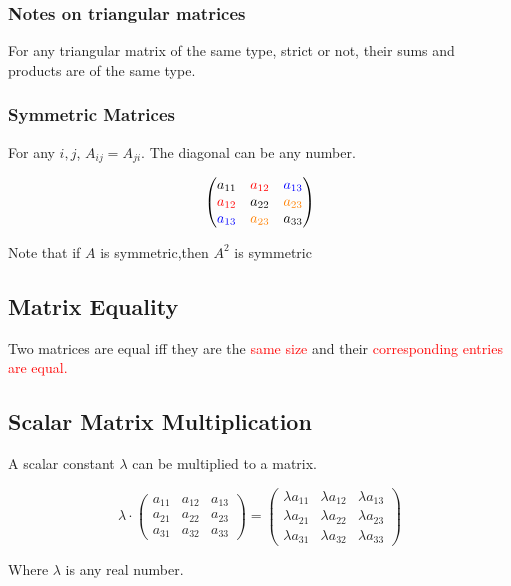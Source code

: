 \documentclass{article}
\begin{document}
\subsubsection{Notes on triangular matrices}
For any triangular matrix of the same type, strict or not, their sums and products are of the same type.

\subsubsection{Symmetric Matrices}
For any $i, j$, $A_{ij} = A_{ji}$. The diagonal can be any number.

\[
\begin{pmatrix}
a_{11} & \textcolor{red}{a_{12}} & \textcolor{blue}{a_{13}} \\
\textcolor{red}{a_{12}} & a_{22} & \textcolor{orange}{a_{23}} \\
\textcolor{blue}{a_{13}} & \textcolor{orange}{a_{23}} & a_{33} 
\end{pmatrix}
\]

Note that if $A$ is symmetric,then $A^2$ is symmetric
\subsection{Matrix Equality}
Two matrices are equal iff they are the \textcolor{red}{same size} and their \textcolor{red}{corresponding entries are equal.}

\subsection{Scalar Matrix Multiplication}
A scalar constant $\lambda$ can be multiplied to a matrix.

\[
\lambda \cdot
\begin{pmatrix}
a_{11} & a_{12} & a_{13} \\
a_{21} & a_{22} & a_{23} \\
a_{31} & a_{32} & a_{33}
\end{pmatrix}
=
\begin{pmatrix}
\lambda a_{11} & \lambda a_{12} & \lambda a_{13} \\
\lambda a_{21} & \lambda a_{22} & \lambda a_{23} \\
\lambda a_{31} & \lambda a_{32} & \lambda a_{33}
\end{pmatrix}
\]
\begin{center}
    Where $\lambda$ is any real number.
\end{center}
\end{document}
